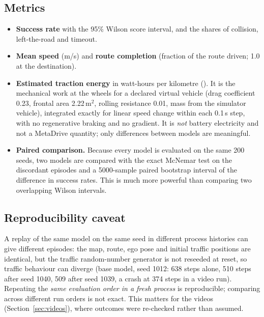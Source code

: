 \subsection{Metrics}
\begin{itemize}
\item \textbf{Success rate} with the 95\% Wilson score interval, and the shares of collision, left-the-road and timeout.
\item \textbf{Mean speed} (m/s) and \textbf{route completion} (fraction of the route driven; 1.0 at the destination).
\item \textbf{Estimated traction energy} in watt-hours per kilometre (). It is the mechanical work at the wheels for a declared virtual vehicle (drag coefficient 0.23, frontal area 2.22\,m$^2$, rolling resistance 0.01, mass from the simulator vehicle), integrated exactly
  for linear speed change within each 0.1\,s step, with no regenerative braking and no gradient. It is \emph{not} battery electricity and not a MetaDrive quantity; only differences between models are meaningful.
\item \textbf{Paired comparison.} Because every model is evaluated on the same 200 seeds, two models are compared with the exact McNemar test on the discordant episodes and a 5000-sample paired bootstrap interval of the difference in success rates. This is much more powerful than comparing two overlapping Wilson intervals.
\end{itemize}

\subsection{Reproducibility caveat}\label{sec:repro}
A replay of the same model on the same seed in different process histories can give different episodes: the map, route, ego pose and initial traffic positions are identical, but the traffic random-number generator is not reseeded at reset, so traffic behaviour can diverge
(base model, seed 1012: 638 steps alone, 510 steps after seed 1040, 509 after seed 1039, a crash at 374 steps in a video run). Repeating the \emph{same evaluation order in a fresh process} is reproducible; comparing across different run orders is not exact.
This matters for the videos (Section~\ref{sec:videos}), where outcomes were re-checked rather than assumed.
